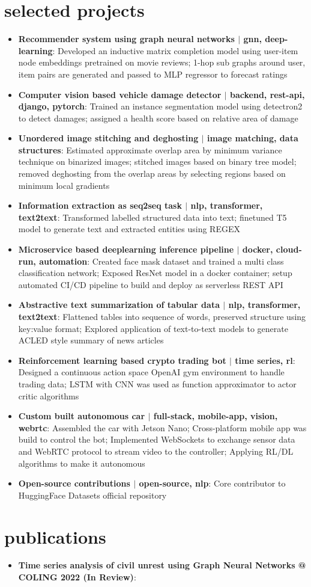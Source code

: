 \documentclass[a4paper,20pt]{article}
\newcommand{\resumeItem}[2]{
  \item\small{
    \textbf{#1}{: #2 \vspace{-2pt}}
  }
}
\newcommand{\resumeSubItem}[2]{\resumeItem{#1}{#2}\vspace{-3pt}}
\newcommand{\resumeSubHeadingListStart}{\begin{itemize}[leftmargin=*]}
\newcommand{\resumeSubHeadingListEnd}{\end{itemize}}
\begin{document}
\section{selected projects}
\resumeSubHeadingListStart
\resumeSubItem{Recommender system using graph neural networks \(|\) gnn, deep-learning}{Developed an inductive matrix completion model using user-item node embeddings pretrained on movie reviews; 1-hop sub graphs around user, item pairs are generated and passed to MLP regressor to forecast ratings}
\vspace{2pt}
\resumeSubItem{Computer vision based vehicle damage detector \(|\) backend, rest-api, django, pytorch}{Trained an instance segmentation model using detectron2 to detect damages; assigned a health score based on relative area of damage}
\vspace{2pt}
\resumeSubItem{Unordered image stitching and deghosting \(|\) image matching, data structures}{Estimated approximate overlap area by minimum variance technique on binarized images; stitched images based on binary tree model; removed deghosting from the overlap areas by selecting regions based on minimum local gradients}
\vspace{2pt}
\resumeSubItem{Information extraction as seq2seq task \(|\) nlp, transformer, text2text}{Transformed labelled structured data into text; finetuned T5 model to generate text and extracted entities using REGEX}
\vspace{2pt}
\resumeSubItem{Microservice based deeplearning inference pipeline \(|\) docker, cloud-run, automation}{Created face mask dataset and trained a multi class classification network; Exposed ResNet model in a docker container; setup automated CI/CD pipeline to build and deploy as serverless REST API}
\vspace{2pt}
\resumeSubItem{Abstractive text summarization of tabular data \(|\) nlp, transformer, text2text}{Flattened tables into sequence of words, preserved structure using key:value format; Explored application of text-to-text models to generate ACLED style summary of news articles}
\vspace{2pt}
\resumeSubItem{Reinforcement learning based crypto trading bot \(|\) time series, rl}{Designed a continuous action space OpenAI gym environment to handle trading data; LSTM with CNN was used as function approximator to actor critic algorithms}
\vspace{2pt}
\resumeSubItem{Custom built autonomous car \(|\) full-stack, mobile-app, vision, webrtc}{Assembled the car with Jetson Nano; Cross-platform mobile app was build to control the bot; Implemented WebSockets to exchange sensor data and WebRTC protocol to stream video to the controller; Applying RL/DL algorithms to make it autonomous}
\vspace{2pt}
\resumeSubItem{Open-source contributions \(|\) open-source, nlp}{Core contributor to HuggingFace Datasets official repository}
\resumeSubHeadingListEnd
\vspace{-5pt}
\section{publications}

\resumeSubHeadingListStart
\resumeSubItem{Time series analysis of civil unrest using Graph Neural Networks @ COLING 2022 (In Review)}{}
\vspace{2pt}
\resumeSubHeadingListEnd
\end{document}
